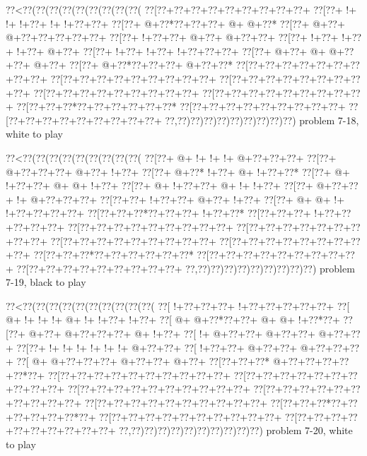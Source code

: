 \vbox{\vbox{\goo
\0??<\0??(\0??(\0??(\0??(\0??(\0??(\0??(\0??(\0??(
\0??[\0??+\0??+\0??+\0??+\0??+\0??+\0??+\0??+\0??+
\0??[\0??+\- !+\- !+\- !+\0??+\- !+\- !+\0??+\0??+
\0??[\0??+\- @+\0??*\0??+\0??+\0??+\- @+\- @+\0??*
\0??[\0??+\- @+\0??+\- @+\0??+\0??+\0??+\0??+\0??+
\0??[\0??+\- !+\0??+\0??+\- @+\0??+\- @+\0??+\0??+
\0??[\0??+\- !+\0??+\- !+\0??+\- !+\0??+\- @+\0??+
\0??[\0??+\- !+\0??+\- !+\0??+\- !+\0??+\0??+\0??+
\0??[\0??+\- @+\0??+\- @+\- @+\0??+\0??+\- @+\0??+
\0??[\0??+\- @+\0??*\0??+\0??+\0??+\- @+\0??+\0??*
\0??[\0??+\0??+\0??+\0??+\0??+\0??+\0??+\0??+\0??+
\0??[\0??+\0??+\0??+\0??+\0??+\0??+\0??+\0??+\0??+
\0??[\0??+\0??+\0??+\0??+\0??+\0??+\0??+\0??+\0??+
\0??[\0??+\0??+\0??+\0??+\0??+\0??+\0??+\0??+\0??+
\0??[\0??+\0??+\0??+\0??+\0??+\0??+\0??+\0??+\0??+
\0??[\0??+\0??+\0??*\0??+\0??+\0??+\0??+\0??+\0??*
\0??[\0??+\0??+\0??+\0??+\0??+\0??+\0??+\0??+\0??+
\0??[\0??+\0??+\0??+\0??+\0??+\0??+\0??+\0??+\0??+
\0??,\0??)\0??)\0??)\0??)\0??)\0??)\0??)\0??)\0??)
}
\hfil problem 7-18, white to play\hfil\break
}

\vbox{\vbox{\goo
\0??<\0??(\0??(\0??(\0??(\0??(\0??(\0??(\0??(\0??(
\0??[\0??+\- @+\- !+\- !+\- !+\- @+\0??+\0??+\0??+
\0??[\0??+\- @+\0??+\0??+\0??+\- @+\0??+\- !+\0??+
\0??[\0??+\- @+\0??*\- !+\0??+\- @+\- !+\0??+\0??*
\0??[\0??+\- @+\- !+\0??+\0??+\- @+\- @+\- !+\0??+
\0??[\0??+\- @+\- !+\0??+\0??+\- @+\- !+\- !+\0??+
\0??[\0??+\- @+\0??+\0??+\- !+\- @+\0??+\0??+\0??+
\0??[\0??+\0??+\- !+\0??+\0??+\- @+\0??+\- !+\0??+
\0??[\0??+\- @+\- @+\- !+\- !+\0??+\0??+\0??+\0??+
\0??[\0??+\0??+\0??*\0??+\0??+\0??+\- !+\0??+\0??*
\0??[\0??+\0??+\0??+\- !+\0??+\0??+\0??+\0??+\0??+
\0??[\0??+\0??+\0??+\0??+\0??+\0??+\0??+\0??+\0??+
\0??[\0??+\0??+\0??+\0??+\0??+\0??+\0??+\0??+\0??+
\0??[\0??+\0??+\0??+\0??+\0??+\0??+\0??+\0??+\0??+
\0??[\0??+\0??+\0??+\0??+\0??+\0??+\0??+\0??+\0??+
\0??[\0??+\0??+\0??*\0??+\0??+\0??+\0??+\0??+\0??*
\0??[\0??+\0??+\0??+\0??+\0??+\0??+\0??+\0??+\0??+
\0??[\0??+\0??+\0??+\0??+\0??+\0??+\0??+\0??+\0??+
\0??,\0??)\0??)\0??)\0??)\0??)\0??)\0??)\0??)\0??)
}
\hfil problem 7-19, black to play\hfil\break
}

\vbox{\vbox{\goo
\0??<\0??(\0??(\0??(\0??(\0??(\0??(\0??(\0??(\0??(\0??(
\0??[\- !+\0??+\0??+\0??+\- !+\0??+\0??+\0??+\0??+\0??+
\0??[\- @+\- !+\- !+\- !+\- @+\- !+\- !+\0??+\- !+\0??+
\0??[\- @+\- @+\0??*\0??+\0??+\- @+\- @+\- !+\0??*\0??+
\0??[\0??+\- @+\0??+\- @+\0??+\0??+\0??+\- @+\- !+\0??+
\0??[\- !+\- @+\0??+\0??+\- @+\0??+\0??+\- @+\0??+\0??+
\0??[\0??+\- !+\- !+\- !+\- !+\- !+\- !+\- @+\0??+\0??+
\0??[\- !+\0??+\0??+\- @+\0??+\0??+\- @+\0??+\0??+\0??+
\0??[\- @+\- @+\0??+\0??+\0??+\- @+\0??+\0??+\- @+\0??+
\0??[\0??+\0??+\0??*\- @+\0??+\0??+\0??+\0??+\0??*\0??+
\0??[\0??+\0??+\0??+\0??+\0??+\0??+\0??+\0??+\0??+\0??+
\0??[\0??+\0??+\0??+\0??+\0??+\0??+\0??+\0??+\0??+\0??+
\0??[\0??+\0??+\0??+\0??+\0??+\0??+\0??+\0??+\0??+\0??+
\0??[\0??+\0??+\0??+\0??+\0??+\0??+\0??+\0??+\0??+\0??+
\0??[\0??+\0??+\0??+\0??+\0??+\0??+\0??+\0??+\0??+\0??+
\0??[\0??+\0??+\0??*\0??+\0??+\0??+\0??+\0??+\0??*\0??+
\0??[\0??+\0??+\0??+\0??+\0??+\0??+\0??+\0??+\0??+\0??+
\0??[\0??+\0??+\0??+\0??+\0??+\0??+\0??+\0??+\0??+\0??+
\0??,\0??)\0??)\0??)\0??)\0??)\0??)\0??)\0??)\0??)\0??)
}
\hfil problem 7-20, white to play\hfil\break
}

